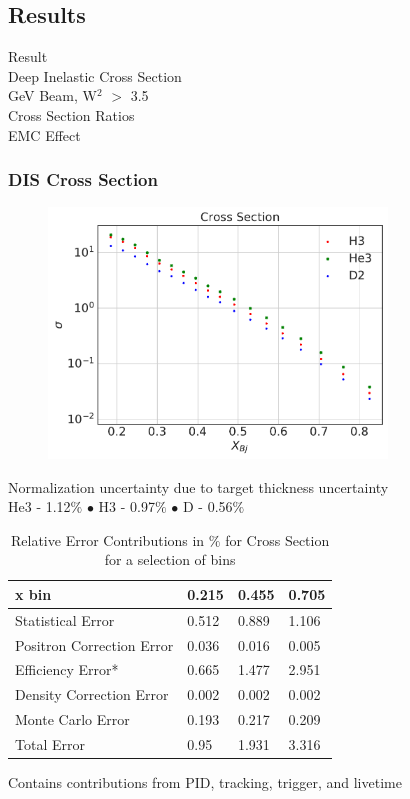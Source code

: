 \documentclass[12pt,usenames,dvipsnames]{beamer}
\begin{document}
\subsection[Results]{Results}
\begin{frame}
\Huge{Result}\\
\Large{Deep Inelastic Cross Section}\\
 GeV Beam, W$^2$ $>$ 3.5 \\
\Large{Cross Section Ratios}\\
\Large{EMC Effect}


\end{frame}

\begin{frame}{}
\frametitle{DIS Cross Section}
\centering
\vspace{-20pt}
\begin{figure}
	\includegraphics[width=9cm]{../images/total_xs.pdf}
\end{figure}

Normalization uncertainty due to target thickness uncertainty\\
He3 - 1.12$\%$ $\bullet$ H3 - 0.97$\%$ $\bullet$  D - 0.56$\%$
\end{frame}
\begin{frame}{}
\begin{table}[]
		\caption*{Relative Error Contributions in $\%$ for Cross Section for a selection of bins}
	\begin{tabular}{|l|l|l|l|}
		\hline
		\textbf{\qquad \qquad\qquad x bin}   & \textbf{0.215} & \textbf{0.455} & \textbf{0.705} \\ \hline\hline
		Statistical Error            & 0.512 & 0.889 & 1.106 \\ \hline
		Positron Correction Error    & 0.036 & 0.016 & 0.005 \\ \hline
		Efficiency Error*            & 0.665 & 1.477 & 2.951 \\ \hline
		Density Correction Error     & 0.002 & 0.002 & 0.002 \\ \hline
		Monte Carlo Error            & 0.193 & 0.217 & 0.209 \\ \hline
		Total Error		 	 		 & 0.95  & 1.931 & 3.316 \\ \hline
	\end{tabular}
\end{table}
\centering	* Contains contributions from PID, tracking, trigger, and livetime

\end{frame}
\end{document}
